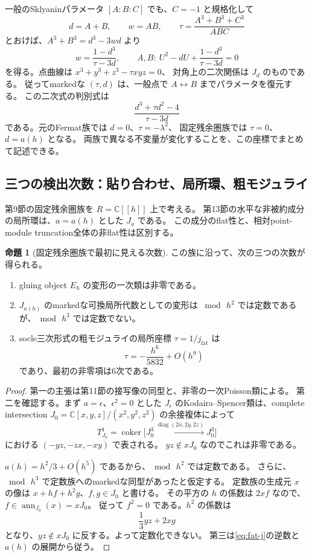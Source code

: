 \documentclass[a4paper,11pt]{ltjsarticle}
\theoremstyle{definition}
\newtheorem{theorem}{命題}[section]
\newcommand{\CC}{\mathbb C}
\begin{document}
一般のSklyaninパラメータ $[A:B:C]$ でも、$C=-1$ と規格化して
\[
 d=A+B,\qquad w=AB,\qquad
 \tau=\frac{A^3+B^3+C^3}{ABC}
\]
とおけば、$A^3+B^3=d^3-3wd$ より
\begin{equation}\label{eq:general-sklyanin-recovery}
 w=\frac{1-d^3}{\tau-3d},\qquad
 A,B:\ U^2-dU+\frac{1-d^3}{\tau-3d}=0
\end{equation}
を得る。点曲線は $x^3+y^3+z^3-\tau xyz=0$、
対角上の二次関係は $J_d$ のものである。
従ってmarkedな $(\tau,d)$ は、一般点で $A\leftrightarrow B$ までパラメータを復元する。
この二次式の判別式は
\[
 \frac{d^3+\tau d^2-4}{\tau-3d}
\]
である。元のFermat族では $d=0$、$\tau=-\lambda^2$、
固定残余圏族では $\tau=0$、$d=a(h)$ となる。
両族で異なる不変量が変化することを、この座標でまとめて記述できる。

\subsection{三つの検出次数：貼り合わせ、局所環、粗モジュライ}

第9節の固定残余圏族を $R=\CC[[h]]$ 上で考える。
第13節の水平な非被約成分の局所環は、$a=a(h)$ とした $J_a$ である。
この成分のflat性と、相対point-module truncation全体の非flat性は区別する。

\begin{theorem}[固定残余圏族で最初に見える次数]\label{thm:orders-126}
この族に沿って、次の三つの次数が得られる。
\begin{enumerate}
 \item gluing object $E_h$ の変形の一次類は非零である。
 \item $J_{a(h)}$ のmarkedな可換局所代数としての変形は
 $\bmod\,h^2$ では定数であるが、$\bmod\,h^3$ では定数でない。
 \item socle三次形式の粗モジュライの局所座標 $\tau=1/j_{\mathrm{fat}}$ は
 \[
   \tau=-\frac{h^6}{5832}+O(h^9)
 \]
 であり、最初の非零項は6次である。
\end{enumerate}
\end{theorem}

\begin{proof}
第一の主張は第11節の接写像の同型と、非零の一次Poisson類による。
第二を確認する。まず $a=\epsilon$、$\epsilon^2=0$ とした
$J_\epsilon$ のKodaira--Spencer類は、complete intersection
$J_0=\CC[x,y,z]/(x^2,y^2,z^2)$ の余接複体によって
\[
 T^1_{J_0}=\operatorname{coker}
 \bigl[J_0^3\xrightarrow{\operatorname{diag}(2x,2y,2z)}J_0^3\bigr]
\]
における $(-yz,-zx,-xy)$ で表される。
$yz\notin xJ_0$ なのでこれは非零である。

$a(h)=h^2/3+O(h^5)$ であるから、$\bmod\,h^2$ では定数である。
さらに、$\bmod\,h^3$ で定数族へのmarkedな同型があったと仮定する。
定数族の生成元 $x$ の像は
$x+h f+h^2g$、$f,g\in J_0$ と書ける。
その平方の $h$ の係数は $2xf$ なので、$f\in\operatorname{ann}_{J_0}(x)=xJ_0$。
従って $f^2=0$ である。$h^2$ の係数は
\[
 \frac13yz+2xg
\]
となり、$yz\notin xJ_0$ に反する。よって定数化できない。
第三は\eqref{eq:fat-j}の逆数と $a(h)$ の展開から従う。
\end{proof}
\end{document}

